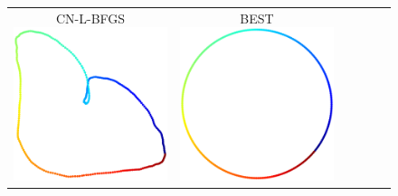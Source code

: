 \documentclass[dvipdfmx,10pt,journal,compsoc]{IEEEtran}
\begin{document}
\begin{figure}[btp]
\begin{tabular}{cccccc}
    \makecell{\small{\textsf{CN-L-BFGS}}                                                                                                                 \\[-0.2em]\includegraphics[width=0.27\columnwidth]{individual/vis/cycle300_CN-L-BFGS.png}} &
    \makecell{\small{\textsf{BEST}}                                                                                                                      \\[-0.2em]\includegraphics[width=0.27\columnwidth]{individual/vis/opt_cycle300.png}} \\


\end{tabular}
\end{figure}
\end{document}

